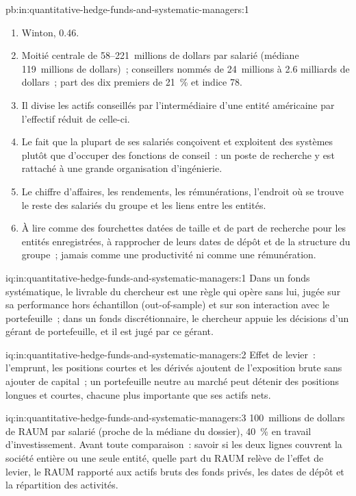 \begin{solution}{pb:in:quantitative-hedge-funds-and-systematic-managers:1}
\begin{enumerate}
\item Winton, 0.46.
\item Moitié centrale de 58--221~millions de dollars par salarié (médiane 119~millions de dollars)~; conseillers nommés de 24~millions à 2.6
milliards de dollars~; part des dix premiers de 21~\% et indice 78.
\item Il divise les actifs conseillés par l'intermédiaire d'une entité américaine par l'effectif réduit de celle-ci.
\item Le fait que la plupart de ses salariés conçoivent et exploitent des systèmes plutôt que d'occuper des fonctions de conseil~: un poste de recherche y est rattaché à une grande
organisation d'ingénierie.
\item Le chiffre d'affaires, les rendements, les rémunérations, l'endroit où se trouve le reste des salariés du groupe et les liens entre les entités.
\item À lire comme des fourchettes datées de taille et de part de recherche pour les entités enregistrées, à rapprocher de leurs dates de dépôt et de la structure du
groupe~; jamais comme une productivité ni comme une rémunération.
\end{enumerate}
\end{solution}

\begin{solution}{iq:in:quantitative-hedge-funds-and-systematic-managers:1}
Dans un fonds systématique, le livrable du chercheur est une règle qui opère sans lui, jugée sur sa performance
hors échantillon (out-of-sample) et sur son interaction avec le portefeuille~; dans un fonds discrétionnaire, le chercheur appuie les décisions d'un gérant de portefeuille,
et il est jugé par ce gérant.
\end{solution}

\begin{solution}{iq:in:quantitative-hedge-funds-and-systematic-managers:2}
Effet de levier~: l'emprunt, les positions courtes et les dérivés ajoutent de l'exposition brute sans ajouter de capital~; un portefeuille neutre au marché
peut détenir des positions longues et courtes, chacune plus importante que ses actifs nets.
\end{solution}

\begin{solution}{iq:in:quantitative-hedge-funds-and-systematic-managers:3}
100~millions de dollars de RAUM par salarié (proche de la médiane du dossier), 40~\% en travail d'investissement. Avant toute comparaison~: savoir si les deux
lignes couvrent la société entière ou une seule entité, quelle part du RAUM relève de l'effet de levier, le RAUM rapporté aux actifs bruts des fonds privés, les dates de dépôt
et la répartition des activités.
\end{solution}

